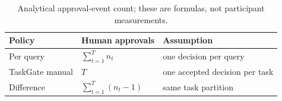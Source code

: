 
\begin{table}[t]
\centering
\caption{Analytical approval-event count; these are formulas, not participant measurements.}
\label{tab:approval-count}
\footnotesize
\begin{tabular}{p{}p{}p{}}
\toprule
Policy & Human approvals & Assumption \\
\midrule
Per query & $\sum_{t=1}^{T} n_t$ & one decision per query \\
TaskGate manual & $T$ & one accepted decision per task \\
Difference & $\sum_{t=1}^{T}(n_t-1)$ & same task partition \\
\bottomrule
\end{tabular}
\end{table}
